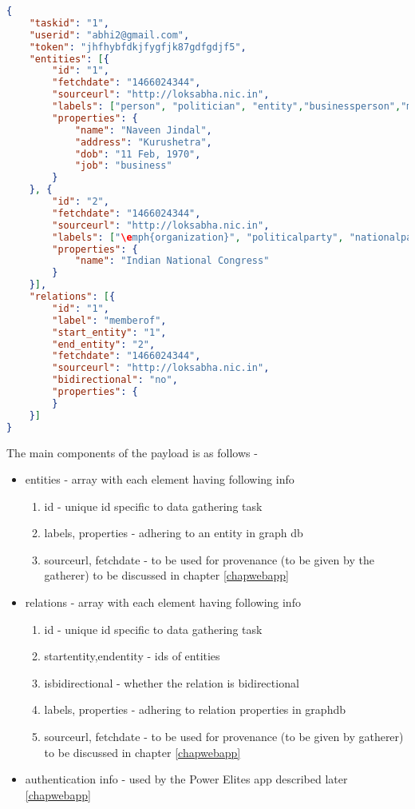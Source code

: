 \begin{lstlisting}[language=json,firstnumber=1]
{
    "taskid": "1",
    "userid": "abhi2@gmail.com",
    "token": "jhfhybfdkjfygfjk87gdfgdjf5",
    "entities": [{
        "id": "1",
        "fetchdate": "1466024344",
        "sourceurl": "http://loksabha.nic.in",
        "labels": ["person", "politician", "entity","businessperson","memberofParliament"],
        "properties": {
            "name": "Naveen Jindal",
            "address": "Kurushetra",
            "dob": "11 Feb, 1970",
            "job": "business"
        }
    }, {
        "id": "2",
        "fetchdate": "1466024344",
        "sourceurl": "http://loksabha.nic.in",
        "labels": ["\emph{organization}", "politicalparty", "nationalparty", "entity"],
        "properties": {
            "name": "Indian National Congress"
        }
    }],
    "relations": [{
        "id": "1",
        "label": "memberof",
        "start_entity": "1",
        "end_entity": "2",
        "fetchdate": "1466024344",
        "sourceurl": "http://loksabha.nic.in",
        "bidirectional": "no",
        "properties": {
        }
    }]
}
\end{lstlisting}

The main components of the payload is as follows -
\begin{itemize}
    \item entities - array with each element having following info
        \begin{enumerate}
            \item id - unique id specific to data gathering task
            \item labels, properties - adhering to an entity in graph db
            \item sourceurl, fetchdate - to be used for provenance (to be given by the gatherer) to be discussed in chapter \ref{chapwebapp}
        \end{enumerate}
    \item relations - array with each element having following info
        \begin{enumerate}
            \item id - unique id specific to data gathering task
            \item startentity,endentity - ids of entities
            \item isbidirectional - whether the relation is bidirectional 
            \item labels, properties - adhering to relation properties in graphdb
            \item sourceurl, fetchdate - to be used for provenance (to be given by gatherer) to be discussed in chapter \ref{chapwebapp}
        \end{enumerate}
    \item authentication info - used by the Power Elites app described later \ref{chapwebapp}
\end{itemize}

